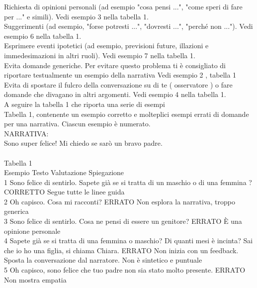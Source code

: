 \begin{itemize}
{       Richiesta di opinioni personali (ad esempio "cosa pensi ...", "come speri di fare per ..." e simili). Vedi esempio 3 nella tabella 1.\\
       Suggerimenti (ad esempio, "forse potresti ...", "dovresti ...", "perché non ..."). Vedi esempio 6 nella tabella 1.\\
       Esprimere eventi ipotetici (ad esempio, previsioni future, illazioni e immedesimazioni in altri ruoli). Vedi esempio 7 nella tabella 1.\\
       Evita domande generiche. Per evitare questo problema ti è consigliato di riportare testualmente un esempio della narrativa Vedi esempio 2 , tabella 1\\
       Evita di spostare il fulcro della conversazione su di te ( osservatore ) o fare domande che divagano in altri argomenti. Vedi esempio 4 nella tabella 1.\\
       A seguire la tabella 1 che riporta una serie di esempi\\
       Tabella 1, contenente un esempio corretto e molteplici esempi errati di domande per una narrativa. Ciascun esempio è numerato.\\
       NARRATIVA:\\
        Sono super felice! Mi chiedo se sarò un bravo padre. \\
       \\
       Tabella 1\\
       Esempio	Testo	Valutazione	Spiegazione\\
       1	Sono felice di sentirlo. Sapete già se si tratta di un maschio o di una femmina ?	CORRETTO	Segue tutte le linee guida\\
       2	Oh capisco. Cosa mi racconti? 	ERRATO	Non esplora la narrativa, troppo generica\\
       3	Sono felice di sentirlo. Cosa ne pensi di essere un genitore?	ERRATO	È una opinione personale\\
       4	Sapete già se si tratta di una femmina o maschio? Di quanti mesi è incinta? Sai che io ho una figlia, si chiama Chiara.	ERRATO	 Non inizia con un feedback. Sposta la conversazione dal narratore. Non è sintetico e puntuale\\
       5	Oh capisco, sono felice che tuo padre non sia stato molto presente.	ERRATO	Non mostra empatia\\
}
\end{itemize}
